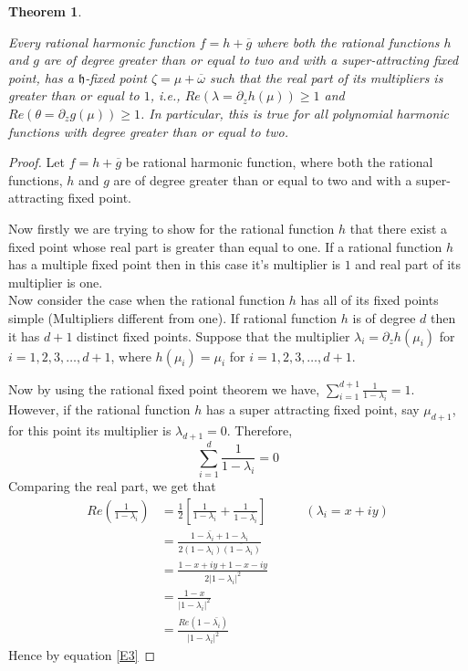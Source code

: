 \documentclass[a4paper,12pt,reqno]{amsart}
\newtheorem{thm}{Theorem}
\begin{document}
\begin{thm}\label{T1}


Every rational harmonic function $f=h+\overline{g}$ where both the rational functions $h$ and $g$ are of degree greater than or equal to two and with a super-attracting fixed point, has a $\mathfrak{h}$-fixed point  $\zeta=\mu+\overline{\omega}$ such that the real part of its multipliers is greater than or equal to $1$, i.e., $Re\left( \lambda=\partial_{z}h(\mu)\right)\geq 1$ and $Re\left( \theta=\partial_{z}g(\mu)\right)\geq 1$. In particular, this is true for all polynomial harmonic functions with degree greater than or equal to two.
    
\end{thm}

\begin{proof}

Let $f=h+\overline{g}$ be rational harmonic function, where both the rational functions, $h$ and $g$ are of degree greater than or equal to two and with a super-attracting fixed point. 



Now firstly we are trying to show for the rational function $h$ that there exist a fixed point whose real part is greater than equal to one. If a rational function $h$ has a multiple fixed point then in this case it's multiplier is $1$ and real part of its multiplier is one.\\

Now consider the case when the rational function $h$ has all of its fixed points simple (Multipliers different from one). If rational function $h$ is of degree $d$ then it has $d+1$ distinct fixed points. Suppose that the multiplier $\lambda_{i}=\partial_{z}h(\mu_{i})$ for $i=1,2,3,\ldots,d+1$, where $h(\mu_{i})=\mu_{i}$ for $i=1,2,3,\ldots, d+1.$ 

Now by  using the rational fixed point theorem we have, $\displaystyle\sum_{i=1}^{d+1}\frac{1}{1-\lambda_{i}}=1$. However, if the rational function $h$ has a super attracting fixed point, say $\mu_{d+1}$, for this point its multiplier is $\lambda_{d+1}=0$. Therefore,
\begin{equation}\label{E3}
\displaystyle\sum_{i=1}^{d}\frac{1}{1-\lambda_{i}}=0
\end{equation}
Comparing the real part, we get that
\begin{align*}
Re\left( \frac{1}{1-\lambda_{i}}\right)&=\frac{1}{2}\left[ \frac{1}{1-\lambda_{i}}+\frac{1}{1-\bar{\lambda_{i}}}\right]\quad\quad\quad(\lambda_{i}=x+iy) \\
&=\frac{1-\bar{\lambda_{i}}+1-\lambda_{i}}{2(1-\lambda_{i})\overline{(1-\lambda_{i})}}\\
&=\frac{1-x+iy+1-x-iy}{2{\vert 1-\lambda_{i}\vert}^{2}}\\
&=\frac{1-x}{{\vert 1-\lambda_{i}\vert}^{2}}\\
&=\frac{Re(1-\bar{\lambda_{i}})}{{\vert 1-\lambda_{i}\vert}^{2}}
\end{align*}
Hence by equation \ref{E3}


\end{proof}
\end{document}
